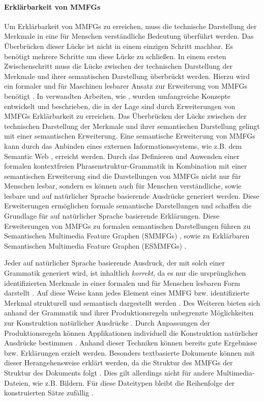 \paragraph{Erklärbarkeit von MMFGs}
\label{sec2:sota:par:explainability-of-mmfgs}
Um Erklärbarkeit von MMFGs zu erreichen, muss die technische Darstellung der Merkmale in eine für Menschen verständliche Bedeutung überführt werden.
Das Überbrücken dieser Lücke ist nicht in einem einzigen Schritt machbar. 
Es benötigt mehrere Schritte um diese Lücke zu schließen.
In einem ersten Zwischenschritt muss die Lücke zwischen der technischen Darstellung der Merkmale und ihrer semantischen Darstellung überbrückt werden.
Hierzu wird ein formaler und für Maschinen lesbarer Ansatz zur Erweiterung von MMFGs benötigt \cite{towards_auto_sem_expl_mmfg}.
In verwandten Arbeiten, wie \cite{towards_auto_sem_expl_mmfg}, wurden umfangreiche Konzepte entwickelt und beschrieben, die in der Lage sind durch Erweiterungen von MMFGs Erklärbarkeit zu erreichen.
Das Überbrücken der Lücke zwischen der technischen Darstellung der Merkmale und ihrer semantischen Darstellung gelingt mit einer semantischen Erweiterung.
Eine semantische Erweiterung von MMFGs kann durch das Anbinden eines externen Informationssystems, wie z.B. dem Semantic Web \cite{sem-web}, erreicht werden.
Durch das Definieren und Anwenden einer formalen kontextfreien Phrasenstruktur-Grammatik \cite{hausser-ps-grammar} in Kombination mit einer semantischen Erweiterung sind die Darstellungen von MMFGs nicht nur für Menschen lesbar, sondern es können auch für Menschen verständliche, sowie lesbare und auf natürlicher Sprache basierende Ausdrücke generiert werden.
Diese Erweiterungen ermöglichen formale semantische Darstellungen und schaffen die Grundlage für auf natürlicher Sprache basierende Erklärungen.
Diese Erweiterungen von MMFGs zu formalen semantischen Darstellungen führen zu Semantischen Multimedia Feature Graphen (SMMFGs) \cite{towards_auto_sem_expl_mmfg}, sowie zu Erklärbaren Semantischen Multimedia Feature Graphen (ESMMFGs) \cite{towards_auto_sem_expl_mmfg}.

Jeder auf natürlicher Sprache basierende Ausdruck, der mit solch einer Grammatik generiert wird, ist inhaltlich \textit{korrekt}, da es nur die ursprünglichen identifizierten Merkmale in einer formalen und für Menschen lesbaren Form darstellt \cite{towards_auto_sem_expl_mmfg}.
Auf diese Weise kann jedes Element eines MMFG bzw. identifizierte Merkmal strukturell und semantisch dargestellt werden \cite{towards_auto_sem_expl_mmfg}.
Des Weiteren bieten sich anhand der Grammatik und ihrer Produktionsregeln unbegrenzte Möglichkeiten zur Konstruktion natürlicher Ausdrücke \cite{towards_auto_sem_expl_mmfg}.
Durch Anpassungen der Produktionsregeln können Applikationen individuell die Konstruktion natürlicher Ausdrücke bestimmen \cite{towards_auto_sem_expl_mmfg}.
Anhand dieser Techniken können bereits gute Ergebnisse bzw. Erklärungen erzielt werden.
Besonders textbasierte Dokumente können mit dieser Herangehensweise erklärt werden, da die Struktur des MMFGs der Struktur des Dokuments folgt \cite{towards_auto_sem_expl_mmfg}.
Dies gilt allerdings nicht für andere Multimedia-Dateien, wie z.B. Bildern. 
Für diese Dateitypen bleibt die Reihenfolge der konstruierten Sätze zufällig \cite{towards_auto_sem_expl_mmfg}.

